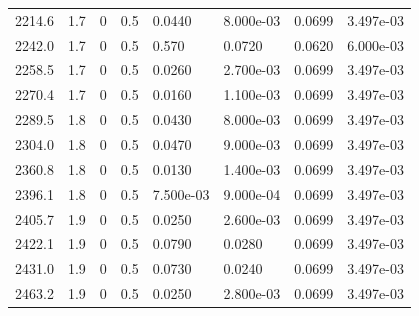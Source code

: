 \documentclass[preview]{standalone}
\begin{document}
{{{{\begin{tabular}{L{1.2cm}C{1.2cm} C{0.3cm}C{0.5cm} C{1.4cm}C{1.4cm} C{1.4cm}C{1.4cm}}
  2214.6  &   1.7  & 0     & 0.5 &  0.0440  & 8.000e-03  & 0.0699 &  3.497e-03   \\ 
  2242.0  &   1.7  & 0     & 0.5 &  0.570  & 0.0720  & 0.0620 &  6.000e-03   \\ 
  2258.5  &   1.7  & 0     & 0.5 &  0.0260  & 2.700e-03  & 0.0699 &  3.497e-03   \\ 
  2270.4  &   1.7  & 0     & 0.5 &  0.0160  & 1.100e-03  & 0.0699 &  3.497e-03   \\ 
  2289.5  &   1.8  & 0     & 0.5 &  0.0430  & 8.000e-03  & 0.0699 &  3.497e-03   \\ 
  2304.0  &   1.8  & 0     & 0.5 &  0.0470  & 9.000e-03  & 0.0699 &  3.497e-03   \\ 
  2360.8  &   1.8  & 0     & 0.5 &  0.0130  & 1.400e-03  & 0.0699 &  3.497e-03   \\ 
  2396.1  &   1.8  & 0     & 0.5 &  7.500e-03  & 9.000e-04  & 0.0699 &  3.497e-03   \\ 
  2405.7  &   1.9  & 0     & 0.5 &  0.0250  & 2.600e-03  & 0.0699 &  3.497e-03   \\ 
  2422.1  &   1.9  & 0     & 0.5 &  0.0790  & 0.0280  & 0.0699 &  3.497e-03   \\ 
  2431.0  &   1.9  & 0     & 0.5 &  0.0730  & 0.0240  & 0.0699 &  3.497e-03   \\ 
  2463.2  &   1.9  & 0     & 0.5 &  0.0250  & 2.800e-03  & 0.0699 &  3.497e-03   \\ 
\hline 
\end{tabular} 

}}}}
\end{document}
